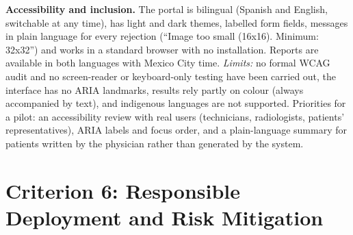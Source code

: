 \documentclass[12pt,a4paper]{article}
\begin{document}
\noindent\textbf{Accessibility and inclusion.} The portal is bilingual (Spanish and English, switchable at any time), has light and dark themes, labelled form fields, messages in plain language
for every rejection (``Image too small (16x16). Minimum: 32x32'') and works in a standard browser with no installation. Reports are available in both languages with Mexico City time.
\emph{Limits:} no formal WCAG audit and no screen-reader or keyboard-only testing have been carried out, the interface has no ARIA landmarks, results rely partly on colour (always accompanied by text),
and indigenous languages are not supported. Priorities for a pilot: an accessibility review with real users (technicians, radiologists, patients' representatives), ARIA labels and focus order, and a plain-language
summary for patients written by the physician rather than generated by the system.

\section{Criterion 6: Responsible Deployment and Risk Mitigation}
\label{sec:m4c6}
\end{document}
